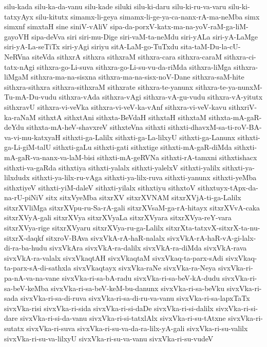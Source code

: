 {silu-kada
silu-ka-da-vanu
silu-kade
siluki
silu-ki-daru
silu-ki-ru-va-varu
silu-ki-tatxyAyx
silu-kitutx
simamx-li-geya
simamx-li-ge-ya-ca-nanx-rA-ma-neMba
simx
simxnf
simxtaH
sine
siniV-vAliV
sipa-da-porxV-katx-ma-na-yoV-raM-ga-liM-gayoVH
sipa-deVva
siri
siri-mu-Dige
siri-vaM-ta-neMdu
siri-yALa
siri-yA-LaMge
siri-yA-La-seTiTx
siri-yAgi
siriyu
sitA-LaM-go-TuTxdu
sita-taM-Du-la-cU-NeRVna
siteVda
sithxrA
sithxra
sithxraM
sithxra-cara
sithxra-caraM
sithxra-ci-tatx-nAgi
sithxra-go-Li-suva
sithxra-go-Li-su-vu-da-riMda
sithxra-liMga
sithxra-liMgaM
sithxra-ma-na-sisxna
sithxra-ma-na-sisx-noV-Dane
sithxra-saM-hite
sithxra-sithxra
sithxra-sithxraM
sithxrate
sithxra-te-yanunx
sithxra-te-ya-nunxM-Tu-mA-Du-vudu
sithxra-vAda
sithxra-vAgi
sithxra-vA-gu-vudu
sithxra-vA-yitutx
sithxravU
sithxra-vi-veVka
sithxra-vi-veV-ka-vAnf
sithxra-vi-veV-kavu
sithxriV-ka-raNaM
sithxtA
sithxtAni
sithxta-BeVdaH
sithxtaH
sithxtaM
sithxta-mA-gaR-deYdu
sithxta-mA-heV-shavxreV
sithxteVna
sithxti
sithxti-dhavxM-sa-ti-roV-BA-va-vi-mu-katxyaH
sithxti-ga-Lalilx
sithxti-ga-La-lilxyU
sithxti-ga-Lanunx
sithxti-ga-Li-giM-talU
sithxti-gaLu
sithxti-gati
sithxtige
sithxti-mA-gaR-diMda
sithxti-mA-gaR-va-nanx-va-laM-bisi
sithxti-mA-geRVNa
sithxti-rA-tamxni
sithxtishacx
sithxti-va-gaRda
sithxtiya
sithxti-yalalx
sithxti-yalelxV
sithxti-yalilx
sithxti-ya-lilxdudx
sithxti-ya-lilx-ru-vAga
sithxti-ya-lilx-ruva
sithxti-yanunx
sithxti-yeMba
sithxtiyeV
sithxti-yiM-daleV
sithxti-yilalx
sithxtiyu
sithxtoV
sithxtuyx-tApx-da-na-rU-piNiV
sitx
sitxVyeMba
sitxrXV
sitxrXVNAM
sitxrXVjA-ti-ga-Lalilx
sitxrXVliMga
sitxrXVpu-ru-Sa-rA-gali
sitxrXVsaM-ga-rA-hitayx
sitxrXVvA-caka
sitxrXVyA-gali
sitxrXVya
sitxrXVyaLa
sitxrXVyara
sitxrXVya-reY-vara
sitxrXVya-rige
sitxrXVyaru
sitxrXVya-ru-ga-Lalilx
sitxrXta-tatxvX-sitxrX-ta-nu-sitxrX-daqkf
sitxroV-BAva
sivxVkA-rA-haR-nalalx
sivxVkA-rA-haR-vA-gi-lalx-di-ra-ba-hudu
sivxVkAra
sivxVkA-ra-dalilx
sivxVkA-ra-diMda
sivxVkA-rava
sivxVkA-ra-valalx
sivxVkaqtAH
sivxVkaqtaM
sivxVkaq-ta-parx-sAdi
sivxVkaq-ta-parx-sA-di-sathxla
sivxVkaqtayx
sivxVka-raNe
sivxVka-ra-Neya
sivxVka-ri-pa-nA-va-na-vane
sivxVka-ri-sa-bA-radu
sivxVka-ri-sa-beV-kA-dudu
sivxVka-ri-sa-beV-keMba
sivxVka-ri-sa-beV-keM-bu-danunx
sivxVka-ri-sa-beVku
sivxVka-ri-sada
sivxVka-ri-sa-di-ruva
sivxVka-ri-sa-di-ru-va-vanu
sivxVka-ri-sa-lapxTaTx
sivxVka-risi
sivxVka-ri-sida
sivxVka-ri-si-daDe
sivxVka-ri-si-dalilx
sivxVka-ri-si-dare
sivxVka-ri-si-da-vanu
sivxVka-ri-si-tatxlAlx
sivxVka-ri-su-tAtxne
sivxVka-ri-sutatx
sivxVka-ri-suva
sivxVka-ri-su-va-da-ra-lilx-yA-gali
sivxVka-ri-su-valilx
sivxVka-ri-su-va-lilxyU
sivxVka-ri-su-va-vanu
sivxVka-ri-su-vudeV
}
